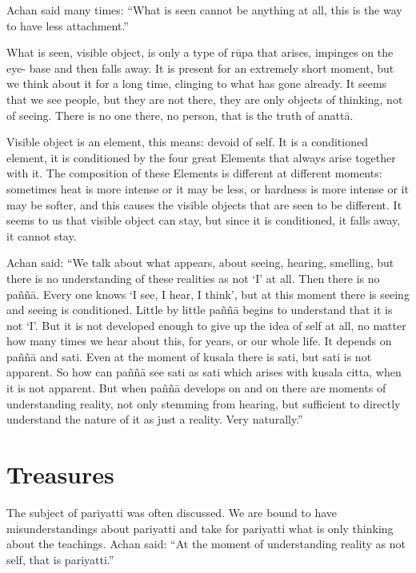 Achan said many times: ``What is seen cannot be anything at all, this is the way to 
have less attachment.'' 

What is seen, visible object, is only a type of rūpa that arises, impinges on the eye- 
base and then falls away. It is present for an extremely short moment, but we think 
about it for a long time, clinging to what has gone already. It seems that we see people, but they are not there, they are only objects of thinking, not of seeing. There is no 
one there, no person, that is the truth of anattā. 

Visible object is an element, this means: devoid of self. It is a conditioned element, it 
is conditioned by the four great Elements that always arise together with it. The composition of these Elements is different at different moments: sometimes heat is more 
intense or it may be less, or hardness is more intense or it may be softer, and this 
causes the visible objects that are seen to be different. It seems to us that visible object can stay, but since it is conditioned, it falls away, it cannot stay. 

Achan said: ``We talk about what appears, about seeing, hearing, smelling, but there 
is no understanding of these realities as not `I' at all. Then there is no paññā. Every 
one knows ‘I see, I hear, I think’, but at this moment there is seeing and seeing is 
conditioned. Little by little paññā begins to understand that it is not `I'. But it is not 
developed enough to give up the idea of self at all, no matter how many times we 
hear about this, for years, or our whole life. It depends on paññā and sati. Even at the 
moment of kusala there is sati, but sati is not apparent. So how can paññā see sati as 
sati which arises with kusala citta, when it is not apparent. But when paññā develops 
on and on there are moments of understanding reality, not only stemming from hearing, but sufficient to directly understand the nature of it as just a reality. Very naturally.'' 



\chapter{Treasures} 

The subject of pariyatti was often discussed. We are bound to have misunderstandings about pariyatti and take for pariyatti what is only thinking about the teachings. Achan said: ``At the moment of understanding reality as not self, that is pariyatti.'' 

